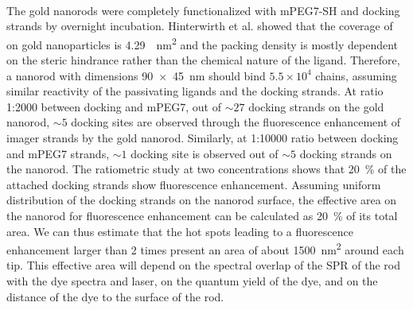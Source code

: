 \paragraph*{} The gold nanorods were completely functionalized with mPEG7-SH and docking strands by overnight incubation.
Hinterwirth et al. showed that the coverage of  on gold nanoparticles is \SI{4.29}{\per\nm\squared} and the packing density is mostly dependent on the steric hindrance rather than the chemical nature of the ligand.\cite{hinterwirth2013quantifying}
Therefore, a nanorod with dimensions \SI[product-units=repeat]{90x45}{\nm} should bind $5.5\times10^4$ chains, assuming similar reactivity of the passivating ligands and the docking strands.
At ratio 1:2000 between docking and mPEG7, out of ${\sim}27$ docking strands on the gold nanorod, ${\sim}5$ docking sites are observed through the fluorescence enhancement of imager strands by the gold nanorod.
Similarly, at 1:10000 ratio between docking and mPEG7 strands, ${\sim}1$ docking site is observed out of ${\sim}5$ docking strands on the nanorod.
The ratiometric study at two concentrations shows that \SI{20}{\percent} of the attached docking strands show fluorescence enhancement.
Assuming uniform distribution of the docking strands on the nanorod surface, the effective area on the nanorod for fluorescence enhancement can be calculated as \SI{20}{\percent} of its total area. We can thus estimate that the hot spots leading to a fluorescence enhancement larger than 2 times present an area of about \SI{1500}{\nm\squared} around each tip. This effective area will depend on the spectral overlap of the SPR of the rod with the dye spectra and laser, on the quantum yield of the dye, and on the distance of the dye to the surface of the rod.


